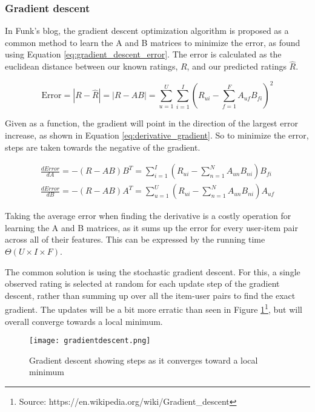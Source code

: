 \subsubsection{Gradient descent}
In Funk's blog, the gradient descent optimization algorithm is proposed as a common method to learn the A and B matrices to minimize the error, as found using Equation \ref{eq:gradient_descent_error}. The error is calculated as the euclidean distance between our known ratings, $R$, and our predicted ratings $\hat{R}$\cite{aibook_gradientdescent_localsearch}.

\begin{equation}\label{eq:gradient_descent_error}
\text{Error} = |R-\hat{R}| = |R - AB| = \sum_{u=1}^{U}\sum_{i=1}^{I}\left (R_{ui}- \sum_{f=1}^{F} A_{uf}B_{fi} \right )^2
\end{equation}

Given as a function, the gradient will point in the direction of the largest error increase, as shown in Equation \ref{eq:derivative_gradient}. So to minimize the error, steps are taken towards the negative of the gradient\cite{aibook_gradientdescent_linearfunc}.

\begin{equation}\label{eq:derivative_gradient}
	\begin{split}
	\frac{dError}{dA}=-(R-AB)B^T = \sum_{i=1}^{I}(R_{ui} - \sum_{n=1}^{N} A_{un}B_{ni})B_{fi}
	\\
	\frac{dError}{dB}=-(R-AB)A^T = \sum_{u=1}^{U}(R_{ui} - \sum_{n=1}^{N} A_{un}B_{ni})A_{uf}
	\end{split}
\end{equation}

Taking the average error when finding the derivative is a costly operation for learning the A and B matrices, as it sums up the error for every user-item pair across all of their features. This can be expressed by the running time $\Theta(U\times I \times F)$.

The common solution is using the stochastic gradient descent. For this, a single observed rating is selected at random for each update step of the gradient descent, rather than summing up over all the item-user pairs to find the exact gradient. The updates will be a bit more erratic than seen in Figure \ref{fig:gradientDescent}\footnote{Source: https://en.wikipedia.org/wiki/Gradient\_descent\label{ftn:wikifigure}}, but will overall converge towards a local minimum.

\begin{figure}
	\centering
	\texttt{[image: gradientdescent.png]}
	\caption{Gradient descent showing steps as it converges toward a local minimum}
	\label{fig:gradientDescent}
\end{figure}

